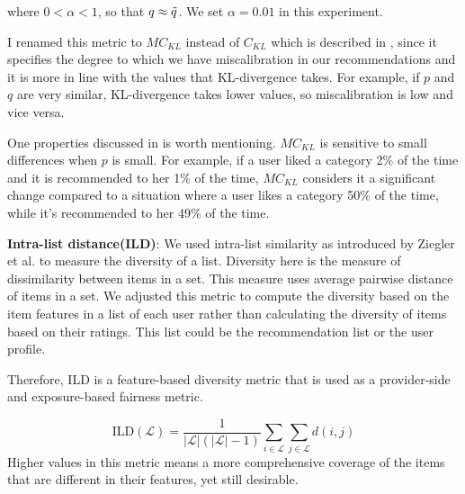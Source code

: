         where $0 < \alpha < 1$, so that $q \approx \Tilde{q}$. We set $\alpha = 0.01$ in this experiment.
        
        I renamed this metric to $MC_{KL}$ instead of $C_{KL}$ which is described in \cite{steck2018calibrated}, since it specifies the degree to which we have miscalibration in our recommendations and it is more in line with the values that KL-divergence takes. For example, if $p$ and $q$ are very similar, KL-divergence takes lower values, so miscalibration is low and vice versa.
        
        One properties discussed in \cite{steck2018calibrated} is worth mentioning. $MC_{KL}$ is sensitive to small differences when $p$ is small. For example, if a user liked a category 2\% of the time and it is recommended to her 1\% of the time, $MC_{KL}$ considers it a significant change compared to a situation where a user likes a category 50\% of the time, while it's recommended to her 49\% of the time. 
    


        \textbf{Intra-list distance(ILD)}: We used intra-list similarity as introduced by Ziegler et al. \cite{ziegler2005improving} to measure the diversity of a list. Diversity here is the measure of dissimilarity between items in a set. This measure uses average pairwise distance of items in a set. We adjusted this metric to compute the diversity based on the item features in a list of each user rather than calculating the diversity of items based on their ratings. This list could be the recommendation list or the user profile.
        
        Therefore, ILD is a feature-based diversity metric that is used as a provider-side and exposure-based fairness metric.
        
        
        \begin{equation}
            \text{ILD}(\mathcal{L}) = \frac{1} {|\mathcal{L}|(|\mathcal{L}|-1)} \sum_{i \in \mathcal{L}}\sum_{j \in \mathcal{L}}d(i,j)
        \end{equation}
        Higher values in this metric means a more comprehensive coverage of the items that are different in their features, yet still desirable.




